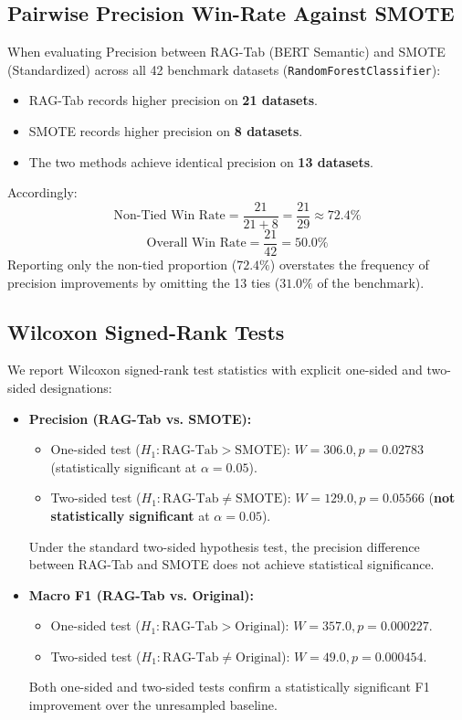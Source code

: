 \documentclass[sn-basic]{sn-jnl}
\begin{document}
\subsection{Pairwise Precision Win-Rate Against SMOTE}
When evaluating Precision between RAG-Tab (BERT Semantic) and SMOTE (Standardized) across all 42 benchmark datasets (\texttt{RandomForestClassifier}):
\begin{itemize}
    \item RAG-Tab records higher precision on \textbf{21 datasets}.
    \item SMOTE records higher precision on \textbf{8 datasets}.
    \item The two methods achieve identical precision on \textbf{13 datasets}.
\end{itemize}
Accordingly:
\begin{equation}
\label{eq:win_rate_nontied}
\text{Non-Tied Win Rate} = \frac{21}{21 + 8} = \frac{21}{29} \approx 72.4\%
\end{equation}
\begin{equation}
\label{eq:win_rate_overall}
\text{Overall Win Rate} = \frac{21}{42} = 50.0\%
\end{equation}
Reporting only the non-tied proportion ($72.4\%$) overstates the frequency of precision improvements by omitting the 13 ties ($31.0\%$ of the benchmark).

\subsection{Wilcoxon Signed-Rank Tests}
We report Wilcoxon signed-rank test statistics with explicit one-sided and two-sided designations:
\begin{itemize}
    \item \textbf{Precision (RAG-Tab vs. SMOTE):}
    \begin{itemize}
        \item One-sided test ($H_1: \text{RAG-Tab} > \text{SMOTE}$): $W = 306.0, p = 0.02783$ (statistically significant at $\alpha = 0.05$).
        \item Two-sided test ($H_1: \text{RAG-Tab} \ne \text{SMOTE}$): $W = 129.0, p = 0.05566$ (\textbf{not statistically significant} at $\alpha = 0.05$).
    \end{itemize}
    Under the standard two-sided hypothesis test, the precision difference between RAG-Tab and SMOTE does not achieve statistical significance.
    \item \textbf{Macro F1 (RAG-Tab vs. Original):}
    \begin{itemize}
        \item One-sided test ($H_1: \text{RAG-Tab} > \text{Original}$): $W = 357.0, p = 0.000227$.
        \item Two-sided test ($H_1: \text{RAG-Tab} \ne \text{Original}$): $W = 49.0, p = 0.000454$.
    \end{itemize}
    Both one-sided and two-sided tests confirm a statistically significant F1 improvement over the unresampled baseline.
\end{itemize}
\end{document}
